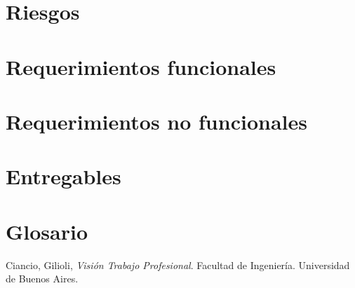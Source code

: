 \documentclass[12pt,a4paper]{article}
\begin{document}
	\section{Riesgos}
	\section{Requerimientos funcionales}
	\section{Requerimientos no funcionales}
	\section{Entregables}
	\section{Glosario}

\newpage
\begin{thebibliography}{9}
	Ciancio, Gilioli,
	\emph{Visión Trabajo Profesional}.
	Facultad de Ingeniería.
	Universidad de Buenos Aires. 
\end{thebibliography}
\end{document}
